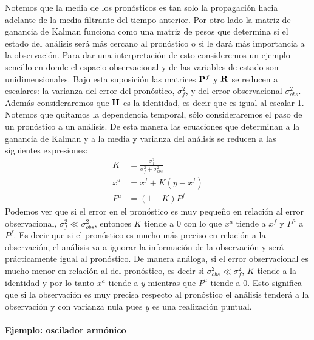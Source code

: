 Notemos que la media de los pronósticos es tan solo la propagación hacia adelante de la media filtrante del tiempo anterior. Por otro lado la matriz de ganancia de Kalman funciona como una matriz de pesos que determina si el estado del análisis será más cercano al pronóstico o si le dará más importancia a la observación. Para dar una interpretación de esto consideremos un ejemplo sencillo en donde el espacio observacional y de las variables de estado son unidimensionales. Bajo esta suposición las matrices $\mathbf{P}^f$ y $\mathbf{R}$ se reducen a escalares: la varianza del error del pronóstico, $\sigma_f^2$, y del error observacional $\sigma_{obs}^2$. Además consideraremos que $\mathbf{H}$ es la identidad, es decir que es igual al escalar 1. Notemos que quitamos la dependencia temporal, sólo consideraremos el paso de un pronóstico a un análisis. De esta manera las ecuaciones que determinan a la ganancia de Kalman y a la media y varianza del análisis se reducen a las siguientes expresiones:
\begin{align}
    K &= \frac{\sigma_f^2}{\sigma_f^2 + \sigma_{obs}^2} \\ 
    x^a &=  x^f + K (y - x^f) \\ 
    P^a &= (1 - K)  P^f
\end{align}
Podemos ver que si el error en el pronóstico es muy pequeño en relación al error observacional, $\sigma_f^2 \ll \sigma_{obs}^2$, entonces $K$ tiende a 0 con lo que $x^a$ tiende a $x^f$ y $P^a$ a $P^f$. Es decir que si el pronóstico es mucho más preciso en relación a la observación, el análisis va a ignorar la información de la observación y será prácticamente igual al pronóstico. De manera análoga, si el error observacional es mucho menor en relación al del pronóstico, es decir si $\sigma_{obs}^2 \ll \sigma_f^2$, $K$ tiende a la identidad y por lo tanto $x^a$ tiende a $y$ mientras que $P^a$ tiende a 0. Esto significa que si la observación es muy precisa respecto al pronóstico el análisis tenderá a la observación y con varianza nula pues $y$ es una realización puntual.

\paragraph{Ejemplo: oscilador armónico} \

